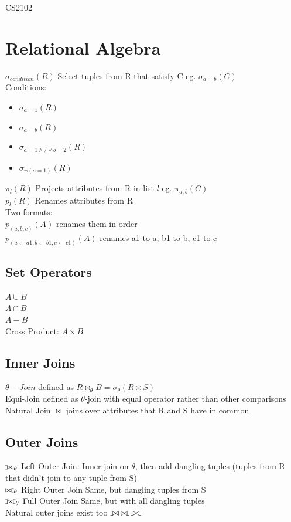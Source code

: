\documentclass{article}
\def\ojoin{\setbox0=\hbox{$\bowtie$}%
  \rule[-.02ex]{.25em}{.4pt}\llap{\rule[\ht0]{.25em}{.4pt}}}
\def\leftouterjoin{\mathbin{\ojoin\mkern-5.8mu\bowtie}}
\def\rightouterjoin{\mathbin{\bowtie\mkern-5.8mu\ojoin}}
\def\fullouterjoin{\mathbin{\ojoin\mkern-5.8mu\bowtie\mkern-5.8mu\ojoin}}
\begin{document}
\begin{multicols*}{2}
    {\LARGE CS2102}
    \section*{Relational Algebra}
    $\sigma_{condition}(R)$ Select tuples from R that satisfy C eg. $\sigma_{a=b}(C)$\\
    Conditions:
    \begin{itemize}
        \item $\sigma_{a=1}(R)$
        \item $\sigma_{a=b}(R)$
        \item $\sigma_{a=1 \wedge/\vee b=2}(R)$
        \item $\sigma_{\neg (a=1)}(R)$

    \end{itemize}
    $\pi_{l}(R)$ Projects attributes from R in list $l$ eg. $\pi_{a,b}(C)$\\
    $p_{l}(R)$ Renames attributes from R \\
    Two formats: \\
    $p_{(a,b,c)}(A)$ renames them in order \\
    $p_{(a \leftarrow a1,b \leftarrow b1,c \leftarrow c1)}(A)$ renames a1 to a, b1 to b, c1 to c
    \subsection*{Set Operators}
    $A \cup B$\\ $A \cap B$\\ $A - B$ \\
    Cross Product: $A \times B$
    \subsection*{Inner Joins}
    $\theta-Join$ defined as $R \Join_\theta B = \sigma_{\theta}(R \times S)$\\
    Equi-Join defined as $\theta$-join with equal operator rather than other comparisons\\
    Natural Join $\Join$ joins over attributes that R and S have in common
    \subsection*{Outer Joins}
    $\leftouterjoin_\theta$ Left Outer Join: Inner join on $\theta$, then add dangling tuples (tuples from R that didn't join to any tuple from S)\\
    $\rightouterjoin_\theta$ Right Outer Join Same, but dangling tuples from S\\
    $\fullouterjoin_\theta$ Full Outer Join Same, but with all dangling tuples\\
    Natural outer joins exist too $\leftouterjoin \rightouterjoin \fullouterjoin$

\end{multicols*}
\end{document}
